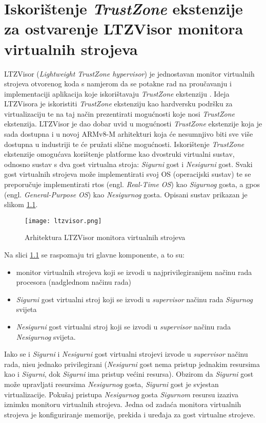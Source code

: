 \documentclass[times, utf8, diplomski, numeric]{fer}
\begin{document}
\chapter{Iskorištenje \textit{TrustZone} ekstenzije za ostvarenje LTZVisor monitora virtualnih strojeva}
LTZVisor (\textit{Lightweight TrustZone hypervisor}) je jednostavan monitor virtualnih strojeva otvorenog koda s namjerom
da se potakne rad na proučavanju i implementaciji aplikacija koje iskorištavaju \textit{TrustZone} ekstenziju \cite{ltzvisor}.
Ideja LTZVisora je iskoristiti \textit{TrustZone} ekstenziju kao hardversku podršku za virtualizaciju te na taj način
prezentirati mogućnosti koje nosi \textit{TrustZone} ekstenzija. LTZVisor je dao dobar uvid u mogućnosti \textit{TrustZone}
ekstenzije koja je sada dostupna i u novoj ARMv8-M arhitekturi koja će nesumnjivo biti sve više dostupna u industriji te
će pružati slične mogućnosti. Iskorištenje \textit{TrustZone} ekstenzije omogućava korištenje platforme kao dvostruki virtualni
sustav, odnosno sustav s dva gost virtualna stroja: \textit{Sigurni} gost i \textit{Nesigurni} gost. Svaki gost virtualnih strojeva može
implementirati svoj OS (operacijski sustav) te se preporučuje implementirati \gls{rtos} (engl. \textit{Real-Time OS}) kao
\textit{Sigurnog} gosta, a \gls{gpos} (engl. \textit{General-Purpose OS}) kao \textit{Nesigurnog} gosta.
Opisani sustav prikazan je slikom \ref{ltzvisor}.
\begin{figure}[H]
  \centering
	\texttt{[image: ltzvisor.png]}%
	\caption{Arhitektura LTZVisor monitora virtualnih strojeva \cite{ltzvisor}}
	\label{ltzvisor}%
\end{figure}
Na slici \ref{ltzvisor} se raspoznaju tri glavne komponente, a to su:
\begin{itemize}
  \item{monitor virtualnih strojeva koji se izvodi u najprivilegiranijem načinu rada procesora (nadglednom načinu rada)}
  \item{\textit{Sigurni} gost virtualni stroj koji se izvodi u \textit{supervisor} načinu rada \textit{Sigurnog} svijeta}
  \item{\textit{Nesigurni} gost virtualni stroj koji se izvodi u \textit{supervisor} načinu rada \textit{Nesigurnog} svijeta.}
\end{itemize}
Iako se i \textit{Sigurni} i \textit{Nesigurni} gost virtualni strojevi izvode u \textit{supervisor} načinu rada, nisu jednako privilegirani
(\textit{Nesigurni} gost nema pristup jednakim resursima kao i \textit{Sigurni}, dok \textit{Sigurni} ima pristup većini resursa). Obzirom da
\textit{Sigurni} gost može upravljati resursima \textit{Nesigurnog} gosta, \textit{Sigurni} gost je svjestan virtualizacije. Pokušaj pristupa \textit{Nesigurnog}
gosta \textit{Sigurnom} resursu izaziva iznimku monitoru virtualnih strojeva.
Jedna od zadaća monitora virtualnih strojeva je konfiguriranje memorije, prekida i uređaja za gost virtualne strojeve.
\end{document}
